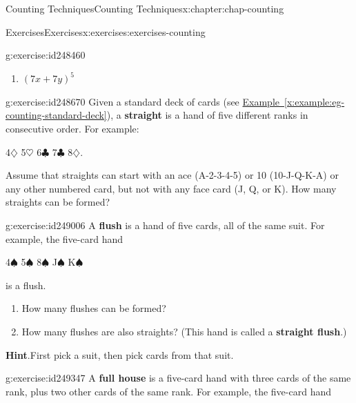 \documentclass[oneside,10pt,]{book}
\newcommand{\blocktitlefont}{\relax}
\newcommand{\xreffont}{\relax}
\newcommand{\terminology}[1]{\textbf{#1}}
\numberwithin{equation}{section}
\begin{document}
\begin{chapterptx}{Counting Techniques}{}{Counting Techniques}{}{}{x:chapter:chap-counting}
\begin{exercises-section}{Exercises}{}{Exercises}{}{}{x:exercises:exercises-counting}
\begin{divisionexercise}{7}{}{}{g:exercise:id248460}
\begin{enumerate}[label=(\alph*)]
\item{}\(\displaystyle (7x + 7y)^5\)%
\end{enumerate}
%
\end{divisionexercise}%
\begin{divisionexercise}{8}{}{}{g:exercise:id248670}%
Given a standard deck of cards (see \hyperref[x:example:eg-counting-standard-deck]{Example~{\xreffont\ref{x:example:eg-counting-standard-deck}}}), a \terminology{straight} is a hand of five different ranks in consecutive order. For example:%
\begin{sidebyside}{1}{0.3}{0.3}{0}%
\begin{sbspanel}{0.4}%
4\(\diamondsuit\) 5\(\heartsuit\) 6\(\clubsuit\) 7\(\clubsuit\) 8\(\diamondsuit\).%
\end{sbspanel}%
\end{sidebyside}%
\par
Assume that straights can start with an ace (A-2-3-4-5) or 10 (10-J-Q-K-A) or any other numbered card, but not with any face card (J, Q, or K). How many straights can be formed?%
\end{divisionexercise}%
\begin{divisionexercise}{9}{}{}{g:exercise:id249006}%
A \terminology{flush} is a hand of five cards, all of the same suit. For example, the five-card hand%
\begin{sidebyside}{1}{0.3}{0.3}{0}%
\begin{sbspanel}{0.4}%
4\(\spadesuit\) 5\(\spadesuit\) 8\(\spadesuit\) J\(\spadesuit\) K\(\spadesuit\)%
\end{sbspanel}%
\end{sidebyside}%
\par
is a flush.%
\par
%
\begin{enumerate}[label=(\alph*)]
\item{}How many flushes can be formed?%
\item{}How many flushes are also straights? (This hand is called a \terminology{straight flush}.)%
\end{enumerate}
%
\par\smallskip%
\noindent\textbf{\blocktitlefont Hint}.\hypertarget{g:hint:id249331}{}\quad{}First pick a suit, then pick cards from that suit.%
\end{divisionexercise}%
\begin{divisionexercise}{10}{}{}{g:exercise:id249347}%
A \terminology{full house} is a five-card hand with three cards of the same rank, plus two other cards of the same rank. For example, the five-card hand%

\end{divisionexercise}
\end{exercises-section}
\end{chapterptx}
\end{document}
